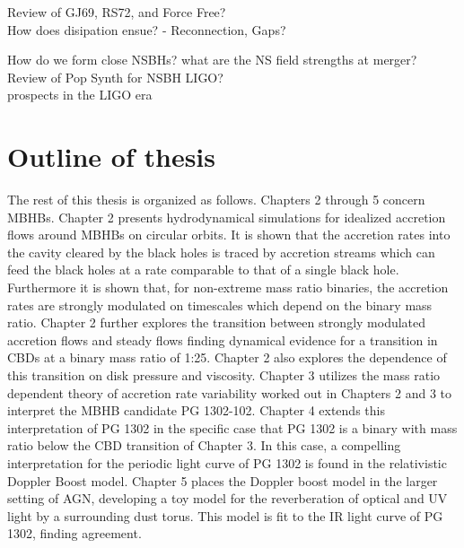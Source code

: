 

Review of GJ69, RS72, and Force Free?\\
How does disipation ensue? - Reconnection, Gaps?

How do we form close NSBHs?
what are the NS field strengths at merger?\\

Review of Pop Synth for NSBH LIGO?\\
prospects in the LIGO era









\section{Outline of thesis}  
The rest of this thesis is organized as follows.
Chapters 2 through 5 concern MBHBs. Chapter 2 presents hydrodynamical
simulations for idealized accretion flows around MBHBs on circular orbits. It
is shown that the accretion rates into the cavity cleared by the black holes
is traced by accretion streams which can feed the black holes at a rate
comparable to that of a single black hole. Furthermore it is shown that, for
non-extreme mass ratio binaries, the accretion rates are strongly modulated on
timescales which depend on the binary mass ratio. Chapter 2 further explores
the transition between strongly modulated accretion flows and steady flows
finding dynamical evidence for a transition in CBDs at a binary mass ratio of
1:25. Chapter 2 also explores the dependence of this transition on disk
pressure and viscosity. Chapter 3 utilizes the mass ratio dependent theory of
accretion rate variability worked out in Chapters 2 and 3 to interpret the
MBHB candidate PG 1302-102. Chapter 4 extends this interpretation of PG 1302
in the specific case that PG 1302 is a binary with mass ratio below the CBD
transition of Chapter 3. In this case, a compelling interpretation for the
periodic light curve of PG 1302 is found in the relativistic Doppler Boost
model. Chapter 5 places the Doppler boost model in the larger setting of AGN,
developing a toy model for the reverberation of optical and UV light by a
surrounding dust torus. This model is fit to the IR light curve of PG 1302,
finding agreement.

